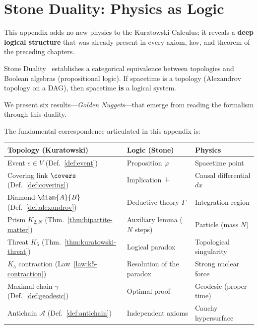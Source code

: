 
\chapter{Stone Duality: Physics as Logic}
\label{app:stone-duality}

\begin{introduction}
  \item This appendix adds no new physics to the Kuratowski
        Calculus; it reveals a \textbf{deep logical structure} that
        was already present in every axiom, law, and theorem of the
        preceding chapters.
  \item Stone Duality~\cite{stone1936,stone1937,johnstone1982}
        establishes a categorical equivalence between topologies and
        Boolean algebras (propositional logic). If
        spacetime is a topology (Alexandrov topology on a DAG),
        then spacetime \textbf{is} a logical system.
  \item We present six results---\emph{Golden Nuggets}---that
        emerge from reading the formalism through this duality.
\end{introduction}

\noindent
The fundamental correspondence articulated in this appendix is:

\medskip
\begin{center}
\begin{tabular}{p{4.5cm}ll}
\toprule
\textbf{Topology (Kuratowski)} & \textbf{Logic (Stone)} &
  \textbf{Physics}\\
\midrule
Event $e \in V$ (Def.~\ref{def:event})
  & Proposition $\varphi$ & Spacetime point\\
Covering link $\covers$ (Def.~\ref{def:covering})
  & Implication $\vdash$
  & Causal differential $dx$\\
Diamond $\diam{A}{B}$ (Def.~\ref{def:alexandrov})
  & Deductive theory $\Gamma$
  & Integration region\\
Prism $K_{2,N}$ (Thm.~\ref{thm:bipartite-matter})
  & Auxiliary lemma ($N$ steps)
  & Particle (mass $N$)\\
Threat $K_5$ (Thm.~\ref{thm:kuratowski-threat})
  & Logical paradox
  & Topological singularity\\
$K_5$ contraction (Law~\ref{law:k5-contraction})
  & Resolution of the paradox
  & Strong nuclear force\\
Maximal chain $\gamma$ (Def.~\ref{def:geodesic})
  & Optimal proof
  & Geodesic (proper time)\\
Antichain $\mathcal{A}$ (Def.~\ref{def:antichain})
  & Independent axioms
  & Cauchy hypersurface\\
\bottomrule
\end{tabular}
\end{center}

